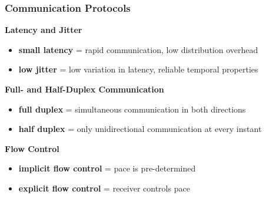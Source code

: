 \documentclass{beamer}
\renewcommand{\emph}[1]{\textbf{\textcolor{greeniot2}{#1}}}
\newcommand{\paragraph}[1]{\vspace{6pt}\textbf{#1}}
\begin{document}
\begin{frame}
  \frametitle{Communication Protocols}

  \paragraph{Latency and Jitter}
  \begin{itemize}
    \item \emph{small latency} = rapid communication, low distribution overhead
    \item \emph{low jitter} = low variation in latency, reliable temporal properties
  \end{itemize}
  
  \paragraph{Full- and Half-Duplex Communication}
  \begin{itemize}
    \item \emph{full duplex} = simultaneous communication in both directions
    \item \emph{half duplex} = only unidirectional communication at every instant
  \end{itemize}
  
  \paragraph{Flow Control}
  \begin{itemize}
    \item \emph{implicit flow control} = pace is pre-determined
    \item \emph{explicit flow control} = receiver controls pace
  \end{itemize}
\end{frame}
\end{document}
